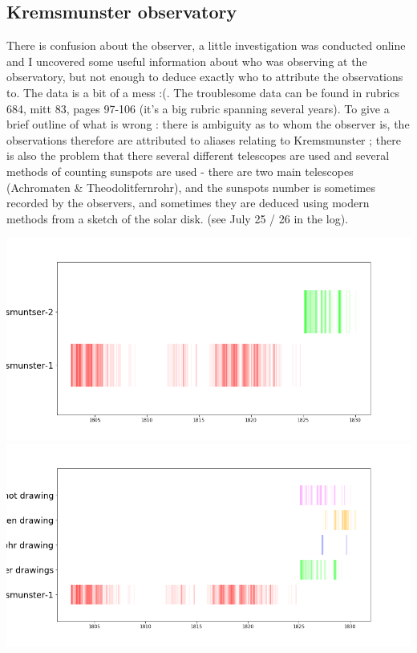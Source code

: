 \documentclass[12pt]{article}
\begin{document}
\subsection{Kremsmunster observatory}
There is confusion about the observer, a little investigation was conducted online and I uncovered some useful information about who was observing at the observatory, but not enough to deduce exactly who to attribute the observations to. The data is a bit of a mess :(. The troublesome data can be found in rubrics 684, mitt 83, pages 97-106 (it's a big rubric spanning several years). To give a brief outline of what is wrong : there is ambiguity as to whom the observer is, the observations therefore are attributed to aliases relating to Kremsmunster ; there is also the problem that there several different telescopes are used and several methods of counting sunspots are used - there are two main telescopes (Achromaten \& Theodolitfernrohr), and the sunspots number is sometimes recorded by the observers, and sometimes they are deduced using modern methods from a sketch of the solar disk. (see July 25 / 26 in the log).\\

{\centering
\includegraphics[width=0.49\linewidth]{kremsmunster_event_og.png}
\includegraphics[width=0.49\linewidth]{kremsmunster_event_after.png}
\par}
\end{document}
